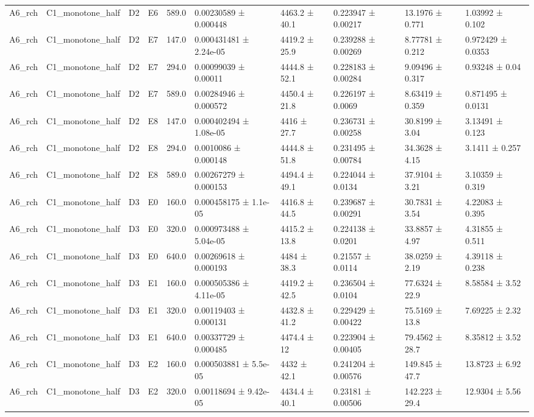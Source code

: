 \begin{table}
\begin{tabular}{llllllllll}
A6\_rch & C1\_monotone\_half & D2 & E6 & 589.0 & 0.00230589 ± 0.000448 & 4463.2 ± 40.1 & 0.223947 ± 0.00217 & 13.1976 ± 0.771 & 1.03992 ± 0.102 \\
A6\_rch & C1\_monotone\_half & D2 & E7 & 147.0 & 0.000431481 ± 2.24e-05 & 4419.2 ± 25.9 & 0.239288 ± 0.00269 & 8.77781 ± 0.212 & 0.972429 ± 0.0353 \\
A6\_rch & C1\_monotone\_half & D2 & E7 & 294.0 & 0.00099039 ± 0.00011 & 4444.8 ± 52.1 & 0.228183 ± 0.00284 & 9.09496 ± 0.317 & 0.93248 ± 0.04 \\
A6\_rch & C1\_monotone\_half & D2 & E7 & 589.0 & 0.00284946 ± 0.000572 & 4450.4 ± 21.8 & 0.226197 ± 0.0069 & 8.63419 ± 0.359 & 0.871495 ± 0.0131 \\
A6\_rch & C1\_monotone\_half & D2 & E8 & 147.0 & 0.000402494 ± 1.08e-05 & 4416 ± 27.7 & 0.236731 ± 0.00258 & 30.8199 ± 3.04 & 3.13491 ± 0.123 \\
A6\_rch & C1\_monotone\_half & D2 & E8 & 294.0 & 0.0010086 ± 0.000148 & 4444.8 ± 51.8 & 0.231495 ± 0.00784 & 34.3628 ± 4.15 & 3.1411 ± 0.257 \\
A6\_rch & C1\_monotone\_half & D2 & E8 & 589.0 & 0.00267279 ± 0.000153 & 4494.4 ± 49.1 & 0.224044 ± 0.0134 & 37.9104 ± 3.21 & 3.10359 ± 0.319 \\
A6\_rch & C1\_monotone\_half & D3 & E0 & 160.0 & 0.000458175 ± 1.1e-05 & 4416.8 ± 44.5 & 0.239687 ± 0.00291 & 30.7831 ± 3.54 & 4.22083 ± 0.395 \\
A6\_rch & C1\_monotone\_half & D3 & E0 & 320.0 & 0.000973488 ± 5.04e-05 & 4415.2 ± 13.8 & 0.224138 ± 0.0201 & 33.8857 ± 4.97 & 4.31855 ± 0.511 \\
A6\_rch & C1\_monotone\_half & D3 & E0 & 640.0 & 0.00269618 ± 0.000193 & 4484 ± 38.3 & 0.21557 ± 0.0114 & 38.0259 ± 2.19 & 4.39118 ± 0.238 \\
A6\_rch & C1\_monotone\_half & D3 & E1 & 160.0 & 0.000505386 ± 4.11e-05 & 4419.2 ± 42.5 & 0.236504 ± 0.0104 & 77.6324 ± 22.9 & 8.58584 ± 3.52 \\
A6\_rch & C1\_monotone\_half & D3 & E1 & 320.0 & 0.00119403 ± 0.000131 & 4432.8 ± 41.2 & 0.229429 ± 0.00422 & 75.5169 ± 13.8 & 7.69225 ± 2.32 \\
A6\_rch & C1\_monotone\_half & D3 & E1 & 640.0 & 0.00337729 ± 0.000485 & 4474.4 ± 12 & 0.223904 ± 0.00405 & 79.4562 ± 28.7 & 8.35812 ± 3.52 \\
A6\_rch & C1\_monotone\_half & D3 & E2 & 160.0 & 0.000503881 ± 5.5e-05 & 4432 ± 42.1 & 0.241204 ± 0.00576 & 149.845 ± 47.7 & 13.8723 ± 6.92 \\
A6\_rch & C1\_monotone\_half & D3 & E2 & 320.0 & 0.00118694 ± 9.42e-05 & 4434.4 ± 40.1 & 0.23181 ± 0.00506 & 142.223 ± 29.4 & 12.9304 ± 5.56 \\

\end{tabular}
\end{table}
